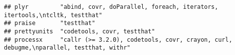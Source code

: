 \documentclass[]{book}
\begin{document}
\begin{verbatim}
## plyr         "abind, covr, doParallel, foreach, iterators, itertools,\ntcltk, testthat"                                                                                                                                                                                                                                                                                                                                                                                                                                                                                                                                                                                                                                
## praise       "testthat"                                                                                                                                                                                                                                                                                                                                                                                                                                                                                                                                                                                                                                                                                                
## prettyunits  "codetools, covr, testthat"                                                                                                                                                                                                                                                                                                                                                                                                                                                                                                                                                                                                                                                                               
## processx     "callr (>= 3.2.0), codetools, covr, crayon, curl, debugme,\nparallel, testthat, withr"                                                                                                                                                                                                                                                                                                                                                                                                                                                                                                                                                                                                                    

\end{verbatim}
\end{document}
